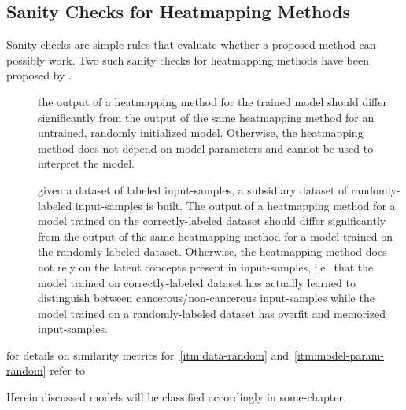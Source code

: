 \subsection{Sanity Checks for Heatmapping Methods}
Sanity checks are simple rules that evaluate whether a proposed method can possibly work. Two such sanity checks for heatmapping methods have been proposed by .

\begin{description}
    \item[]
      the output of a heatmapping method for the trained model should differ significantly from the output of the same heatmapping method for an untrained, randomly initialized model. Otherwise, the heatmapping method does not depend on model parameters and cannot be used to interpret the model.
    \item[] given a dataset of labeled input-samples, a subsidiary dataset of randomly-labeled input-samples is built. The output of a heatmapping method for a model trained on the correctly-labeled dataset should differ significantly from the output of the same heatmapping method for a model trained on the randomly-labeled dataset. Otherwise, the heatmapping method does not rely on the latent concepts present in input-samples, i.e.\ that the model trained on correctly-labeled dataset has actually learned to distinguish between cancerous/non-cancerous input-samples while the model trained on a randomly-labeled dataset has overfit and memorized input-samples.
\end{description}
for details on similarity metrics for~\ref{itm:data-random} and~\ref{itm:model-param-random} refer to~\cite{Adebayo.2018}
\par
Herein discussed models will be classified accordingly in some-chapter. 